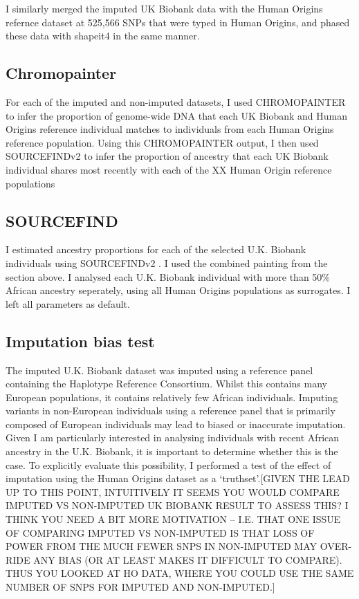 I similarly merged the imputed UK Biobank data with the Human Origins refernce dataset at 525,566 SNPs that were typed in Human Origins, and phased these data with shapeit4 in the same manner.


\subsection{Chromopainter}

For each of the imputed and non-imputed datasets, I used CHROMOPAINTER to infer the proportion of genome-wide DNA that each UK Biobank and Human Origins reference individual matches to individuals from each Human Origins reference population. Using this CHROMOPAINTER output, I then used SOURCEFINDv2 \cite{Chacon-Duque2018} to infer the proportion of ancestry that each UK Biobank individual shares most recently with each of the XX Human Origin reference populations



\subsection{SOURCEFIND}

I estimated ancestry proportions for each of the selected U.K. Biobank individuals using SOURCEFINDv2 \cite{Chacon-Duque2018}. I used the combined painting from the section above. I analysed each U.K. Biobank individual with more than 50\% African ancestry seperately, using all Human Origins populations as surrogates. I left all parameters as default. 

\subsection{Imputation bias test}

The imputed U.K. Biobank dataset was imputed using a reference panel containing the Haplotype Reference Consortium. Whilst this contains many European populations, it contains relatively few African individuals. Imputing variants in non-European individuals using a reference panel that is primarily composed of European individuals may lead to biased or inaccurate imputation. Given I am particularly interested in analysing individuals with recent African ancestry in the U.K. Biobank, it is important to determine whether this is the case. To explicitly evaluate this possibility, I performed a test of the effect of imputation using the Human Origins dataset as a `truthset'.{\color{red}[GIVEN THE LEAD UP TO THIS POINT, INTUITIVELY IT SEEMS YOU WOULD COMPARE IMPUTED VS NON-IMPUTED UK BIOBANK RESULT TO ASSESS THIS? I THINK YOU NEED A BIT MORE MOTIVATION -- I.E. THAT ONE ISSUE OF COMPARING IMPUTED VS NON-IMPUTED IS THAT LOSS OF POWER FROM THE MUCH FEWER SNPS IN NON-IMPUTED MAY OVER-RIDE ANY BIAS (OR AT LEAST MAKES IT DIFFICULT TO COMPARE). THUS YOU LOOKED AT HO DATA, WHERE YOU COULD USE THE SAME NUMBER OF SNPS FOR IMPUTED AND NON-IMPUTED.]}
 
